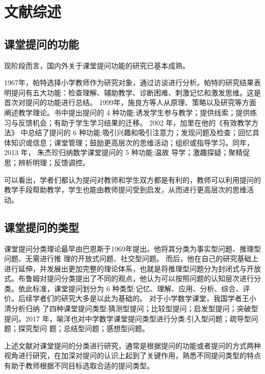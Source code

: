 \chapter{文献综述}


\section{课堂提问的功能}

现阶段而言，国内外关于课堂提问功能的研究已基本成熟。

1967年，帕特选择小学教师作为研究对象，通过访谈进行分析。帕特的研究结果表明提问有五大功能：检查理解、辅助教学、诊断困难、刺激记忆和激发思维。这是首次对提问的功能进行总结。
1999年，施良方等人从原理、策略以及研究等方面阐述教学理论。书中提出提问的 4 种功能:诱发学生参与教学；提供线索；提供练习与反馈机会；有助于学生学习结果的迁移\cite{施良方1999教学理论}。 2002 年，加里在他的《有效教学方法》 中总结了提问的 6 种功能:吸引兴趣和吸引注意力；发现问题及检查；回忆具体知识或信息；课堂管理；鼓励更高层次的思维活动；组织或指导学习\cite{鲍里奇2002有效教学方法}。同年，2013 年， 朱杰珍归纳数学课堂提问的 5 种功能:温故 导学；激趣探疑；聚精促思；辨析明理；反馈调控\cite{朱杰珍2013刍议数学课堂提问的功能与技巧}。

可以看出，学者们都认为提问对教师和学生双方都是有利的，教师可以利用提问的教学手段帮助教学，学生也能由教师提问受到启发，从而进行更高层次的思维活动。



\section{课堂提问的类型}

课堂提问分类理论最早由巴恩斯于1969年提出。他将其分类为事实型问题、推理型问题、无需进行推 理的开放式问题、社交型问题。 而后，他在自己的研究基础上进行延伸，并发展出更加完整的理论体系，也就是将推理型问题分为封闭式与开放式。布鲁姆对提问分类提出了不同的观点，他认为可以按照问题的认知层次进行分类。依此标准，课堂提问划分为 6 种类型:记忆、理解、应用、分析、综合、评价。后续学者们的研究大多是以此为基础的。
对于小学数学课堂，我国学者王小清分析归纳 了四种课堂提问类型:猜测型提问；比较型提问；启发型提问；突破型提问\cite{王小清2020小学数学课堂提问类型探究}。2017 年，喻洋也对中学数学课堂提问类型进行分类:引入型问题；疏导型问题；探究型问 题；总结型问题；感想型问题\cite{喻洋2017中学数学课堂提问的类型与技巧}。

上述文献对课堂提问的分类进行研究，通常是根据提问的功能或者提问的方式两种视角进行研究，在加深对提问的认识上起到了关键作用，熟悉不同提问类型的特点有助于教师根据不同目标选取合适的提问类型。



